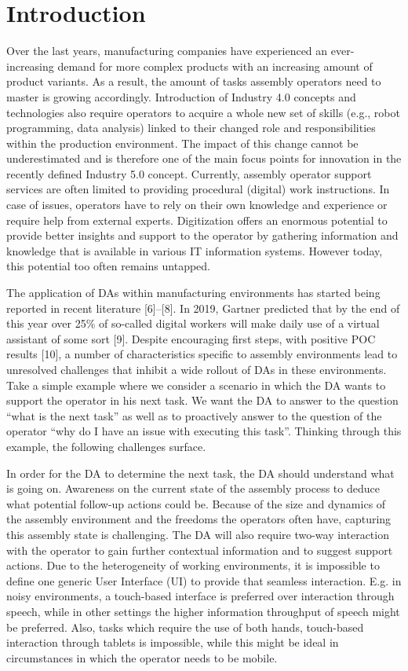 \section{Introduction}\label{sec:Introduction}

Over the last years, manufacturing companies have experienced an ever-increasing demand for more complex products with an increasing amount of product variants. As a result, the amount of tasks assembly operators need to master is growing accordingly. Introduction of Industry 4.0 concepts and technologies also require operators to acquire a whole new set of skills (e.g., robot programming, data analysis) linked to their changed role and responsibilities within the production environment. The impact of this change cannot be underestimated and is therefore one of the main focus points for innovation in the recently defined Industry 5.0 concept. Currently, assembly operator support services are often limited to providing procedural (digital) work instructions. In case of issues, operators have to rely on their own knowledge and experience or require help from external experts. Digitization offers an enormous potential to provide better insights and support to the operator by gathering information and knowledge that is available in various IT information systems. However today, this potential too often remains untapped.

The application of DAs within manufacturing environments has started being reported in recent literature [6]–[8]. In 2019, Gartner predicted that by the end of this year over 25\% of so-called digital workers will make daily use of a virtual assistant of some sort [9]. Despite encouraging first steps, with positive POC results [10], a number of characteristics specific to assembly environments lead to unresolved challenges that inhibit a wide rollout of DAs in these environments. Take a simple example where we consider a scenario in which the DA wants to support the operator in his next task. We want the DA to answer to the question “what is the next task” as well as to proactively answer to the question of the operator “why do I have an issue with executing this task”. Thinking through this example, the following challenges surface.

In order for the DA to determine the next task, the DA should understand what is going on. Awareness on the current state of the assembly process to deduce what potential follow-up actions could be. Because of the size and dynamics of the assembly environment and the freedoms the operators often have, capturing this assembly state is challenging. The DA will also require two-way interaction with the operator to gain further contextual information and to suggest support actions. Due to the heterogeneity of working environments, it is impossible to define one generic User Interface (UI) to provide that seamless interaction. E.g. in noisy environments, a touch-based interface is preferred over interaction through speech, while in other settings the higher information throughput of speech might be preferred. Also, tasks which require the use of both hands, touch-based interaction through tablets is impossible, while this might be ideal in circumstances in which the operator needs to be mobile.

